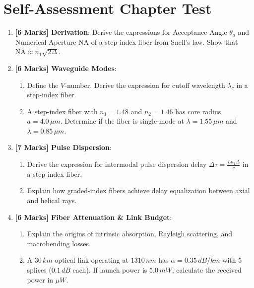 \section{Self-Assessment Chapter Test}

\begin{chaptertest}
\begin{enumerate}
    \item \textbf{[6 Marks] Derivation}: Derive the expressions for Acceptance Angle $\theta_a$ and Numerical Aperture $\text{NA}$ of a step-index fiber from Snell's law. Show that $\text{NA} \approx n_1 \sqrt{2\Delta}$.
    
    \item \textbf{[6 Marks] Waveguide Modes}:
    \begin{enumerate}
        \item Define the $V$-number. Derive the expression for cutoff wavelength $\lambda_c$ in a step-index fiber.
        \item A step-index fiber with $n_1 = 1.48$ and $n_2 = 1.46$ has core radius $a = 4.0\,\si{\mu m}$. Determine if the fiber is single-mode at $\lambda = 1.55\,\si{\mu m}$ and $\lambda = 0.85\,\si{\mu m}$.
    \end{enumerate}
    
    \item \textbf{[7 Marks] Pulse Dispersion}:
    \begin{enumerate}
        \item Derive the expression for intermodal pulse dispersion delay $\Delta \tau = \frac{L n_1 \Delta}{c}$ in a step-index fiber.
        \item Explain how graded-index fibers achieve delay equalization between axial and helical rays.
    \end{enumerate}
    
    \item \textbf{[6 Marks] Fiber Attenuation \& Link Budget}:
    \begin{enumerate}
        \item Explain the origins of intrinsic absorption, Rayleigh scattering, and macrobending losses.
        \item A $30\,\si{km}$ optical link operating at $1310\,\si{nm}$ has $\alpha = 0.35\,\si{dB/km}$ with 5 splices ($0.1\,\si{dB}$ each). If launch power is $5.0\,\si{mW}$, calculate the received power in $\si{\mu W}$.
    \end{enumerate}
\end{enumerate}
\end{chaptertest}

